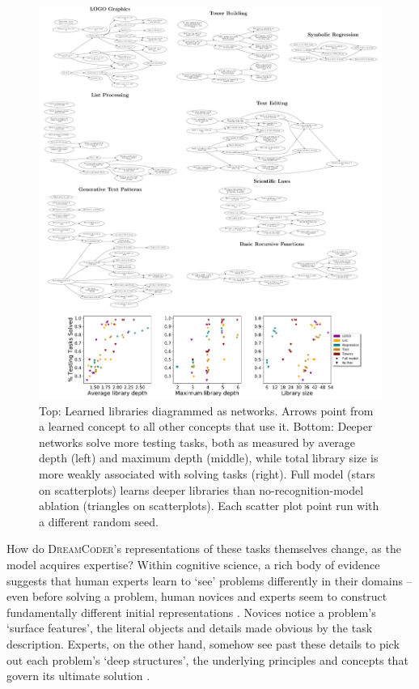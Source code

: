 \documentclass{article}
\newcommand{\systemEnding}{\textsc{DreamCoder}}
\begin{document}
\begin{figure}
  \includegraphics[width = \textwidth]{deepMontage.pdf}
  \caption{Top: Learned libraries diagrammed as networks. Arrows point from a learned concept to all other concepts that use it. Bottom: Deeper networks solve more testing tasks, both as measured by average depth (left) and maximum depth (middle), while total library size is more weakly associated with solving tasks (right). Full model (stars on scatterplots) learns deeper libraries than no-recognition-model ablation (triangles on scatterplots). Each scatter plot point run with a different random seed.}\label{depthMontage}
\end{figure}

How do \systemEnding's representations of these tasks themselves change, as the model acquires expertise? Within cognitive science, a rich body of evidence suggests that human experts learn to `see' problems differently in their domains -- even before solving a problem, human novices and experts seem to construct fundamentally different initial representations \cite{chi1981categorization}. Novices notice a problem’s `surface features', the literal objects and details made obvious by the task description. Experts, on the other hand, somehow see past these details to pick out each problem’s `deep structures', the underlying principles and concepts that govern its ultimate solution \cite{chi2012seeing,chi2006two}.
\end{document}
